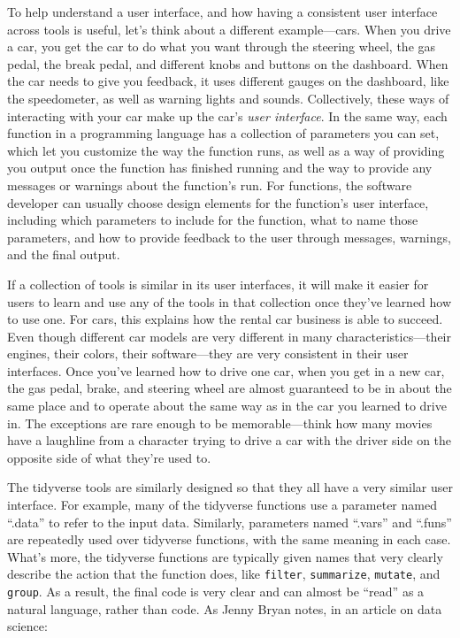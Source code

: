 \documentclass[]{tufte-book}
\begin{document}
To help understand a user interface, and how having a consistent user interface
across tools is useful, let's think about a different example---cars. When you
drive a car, you get the car to do what you want through the steering wheel, the
gas pedal, the break pedal, and different knobs and buttons on the dashboard.
When the car needs to give you feedback, it uses different gauges on the
dashboard, like the speedometer, as well as warning lights and sounds.
Collectively, these ways of interacting with your car make up the car's \emph{user
interface}. In the same way, each function in a programming language has a
collection of parameters you can set, which let you customize the way the
function runs, as well as a way of providing you output once the function has
finished running and the way to provide any messages or warnings about the
function's run. For functions, the software developer can usually choose design
elements for the function's user interface, including which parameters to
include for the function, what to name those parameters, and how to provide
feedback to the user through messages, warnings, and the final output.

If a collection of tools is similar in its user interfaces, it will make it
easier for users to learn and use any of the tools in that collection once
they've learned how to use one. For cars, this explains how the rental car
business is able to succeed. Even though different car models are very different
in many characteristics---their engines, their colors, their software---they are
very consistent in their user interfaces. Once you've learned how to drive one
car, when you get in a new car, the gas pedal, brake, and steering wheel are
almost guaranteed to be in about the same place and to operate about the same
way as in the car you learned to drive in. The exceptions are rare enough to be
memorable---think how many movies have a laughline from a character trying to
drive a car with the driver side on the opposite side of what they're used to.

The tidyverse tools are similarly designed so that they all have a very similar
user interface. For example, many of the tidyverse functions use a parameter
named ``.data'' to refer to the input data. Similarly, parameters
named ``.vars'' and ``.funs'' are repeatedly used over tidyverse functions, with the
same meaning in each case. What's more, the tidyverse functions are typically given names
that very clearly describe the action that the function does, like \texttt{filter},
\texttt{summarize}, \texttt{mutate}, and \texttt{group}. As a result, the final code is very clear
and can almost be ``read'' as a natural language, rather than code. As Jenny
Bryan notes, in an article on data science:
\end{document}
